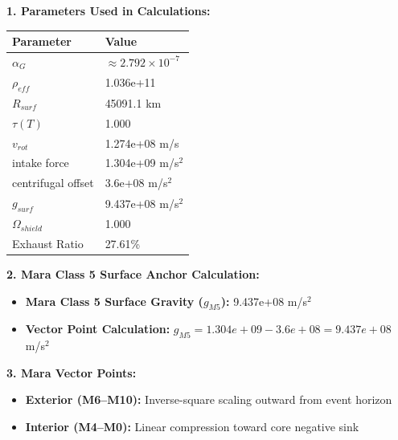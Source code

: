 \documentclass[11pt, a4paper]{article}
\begin{document}
\vspace{0.5em}
\noindent \textbf{1. Parameters Used in Calculations:}
\begin{center}
  \begin{tabular}{|l|l|}
    \hline
    \textbf{Parameter} & \textbf{Value} \\ \hline
    $\alpha_G$ & $\approx 2.792 \times 10^{-7}$ \\ \hline
    $\rho_{eff}$ & 1.036e+11 \\ \hline
    $R_{surf}$ & 45091.1 km \\ \hline
    $\tau(T)$ & 1.000 \\ \hline
    $v_{rot}$ & 1.274e+08 m/s \\ \hline
    intake force & 1.304e+09 m/s$^2$ \\ \hline
    centrifugal offset & 3.6e+08 m/s$^2$ \\ \hline
    $g_{surf}$ & 9.437e+08 m/s$^2$ \\ \hline
    $\Omega_{shield}$ & 1.000 \\ \hline
    Exhaust Ratio & 27.61\% \\ \hline
  \end{tabular}
\end{center}

\vspace{0.5em}
\noindent \textbf{2. Mara Class 5 Surface Anchor Calculation:}
\begin{itemize}
  \item \textbf{Mara Class 5 Surface Gravity ($g_{M5}$):} 9.437e+08 m/s$^2$
  \item \textbf{Vector Point Calculation:} $g_{M5} = 1.304e+09 - 3.6e+08 = 9.437e+08$ m/s$^2$
\end{itemize}

\vspace{0.5em}
\noindent \textbf{3. Mara Vector Points:}
\begin{itemize}
  \item \textbf{Exterior (M6--M10):} Inverse-square scaling outward from event horizon
  \item \textbf{Interior (M4--M0):} Linear compression toward core negative sink
\end{itemize}
\end{document}
